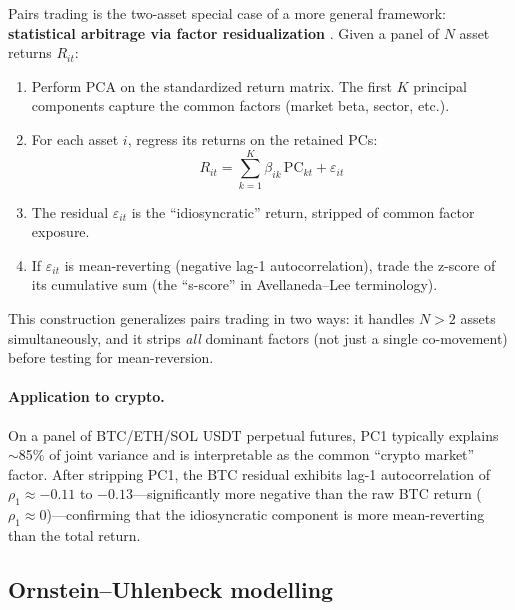 \documentclass[11pt,a4paper]{article}
\begin{document}
Pairs trading is the two-asset special case of a more general
framework: \textbf{statistical arbitrage via factor residualization}
\citep{avellaneda2010statistical}. Given a panel of $N$ asset returns
$R_{it}$:

\begin{enumerate}[leftmargin=1.5em]
  \item Perform PCA on the standardized return matrix. The first $K$
        principal components capture the common factors (market beta,
        sector, etc.).
  \item For each asset $i$, regress its returns on the retained PCs:
        \begin{equation}
          R_{it} = \sum_{k=1}^{K} \beta_{ik}\, \mathrm{PC}_{kt} + \varepsilon_{it}
        \end{equation}
  \item The residual $\varepsilon_{it}$ is the ``idiosyncratic'' return,
        stripped of common factor exposure.
  \item If $\varepsilon_{it}$ is mean-reverting (negative lag-1
        autocorrelation), trade the z-score of its cumulative sum
        (the ``s-score'' in Avellaneda--Lee terminology).
\end{enumerate}

This construction generalizes pairs trading in two ways: it handles
$N > 2$ assets simultaneously, and it strips \emph{all} dominant factors
(not just a single co-movement) before testing for mean-reversion.

\paragraph{Application to crypto.}
On a panel of BTC/ETH/SOL USDT perpetual futures, PC1 typically explains
$\sim$85\% of joint variance and is interpretable as the common ``crypto
market'' factor. After stripping PC1, the BTC residual exhibits lag-1
autocorrelation of $\rho_1 \approx -0.11$ to $-0.13$---significantly
more negative than the raw BTC return ($\rho_1 \approx 0$)---confirming
that the idiosyncratic component is more mean-reverting than the
total return.

\subsection{Ornstein--Uhlenbeck modelling}
\end{document}
